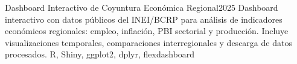 
\begin{projects}


	\project
	{Dashboard Interactivo de Coyuntura Económica Regional}{2025}
	{ }
	{Dashboard interactivo con datos públicos del INEI/BCRP para análisis de indicadores económicos regionales: empleo, inflación, PBI sectorial y producción. Incluye visualizaciones temporales, comparaciones interregionales y descarga de datos procesados.}
	{R, Shiny, ggplot2, dplyr, flexdashboard}








\end{projects}
